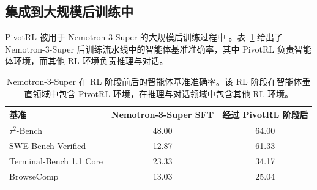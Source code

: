 \subsection{集成到大规模后训练中}
\label{sec:large_scale}

PivotRL 被用于 Nemotron-3-Super 的大规模后训练过程中 \citep{nvidia2025nemotron3super}。表~\ref{tab:large_scale_pivot} 给出了 Nemotron-3-Super 后训练流水线中的智能体基准准确率，其中 PivotRL 负责智能体环境，而其他 RL 环境负责推理与对话。

\begin{table}[t]
\centering
\small
\begin{tabular}{lcc}
\toprule
\textbf{基准} & \textbf{Nemotron-3-Super SFT} & \textbf{经过 PivotRL 阶段后} \\
\midrule
$\tau^2$-Bench         & 48.00 & 64.00 \\
SWE-Bench Verified     & 12.87 & 61.33 \\
Terminal-Bench 1.1 Core & 23.33 & 34.17 \\
BrowseComp             & 13.03 & 25.04 \\
\bottomrule
\end{tabular}
\caption{
Nemotron-3-Super 在 RL 阶段前后的智能体基准准确率。该 RL 阶段在智能体垂直领域中包含 PivotRL 环境，在推理与对话领域中包含其他 RL 环境。
}
\label{tab:large_scale_pivot}
\end{table}
